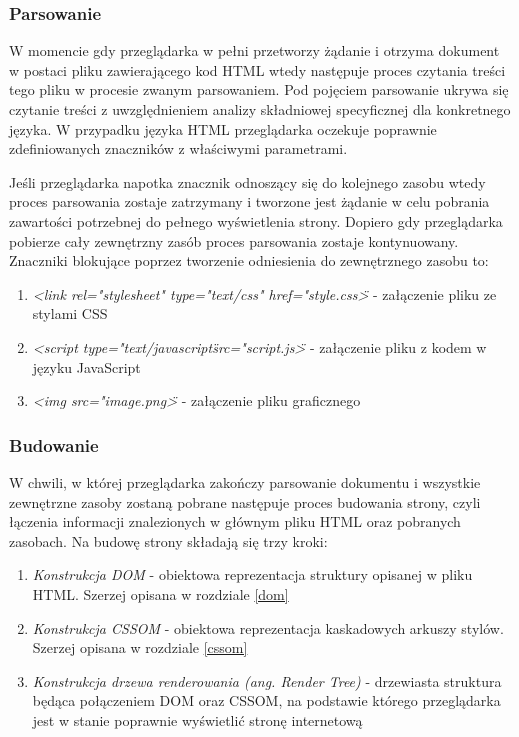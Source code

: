 \documentclass[polish, twoside, 12pt]{mwart}
\begin{document}
\subsubsection{Parsowanie}

W momencie gdy przeglądarka w pełni przetworzy żądanie i otrzyma dokument w postaci pliku zawierającego kod HTML wtedy następuje proces czytania treści tego pliku w procesie zwanym parsowaniem. Pod pojęciem parsowanie ukrywa się czytanie treści z uwzględnieniem analizy składniowej specyficznej dla konkretnego języka. W przypadku języka HTML przeglądarka oczekuje poprawnie zdefiniowanych znaczników z właściwymi parametrami. 

Jeśli przeglądarka napotka znacznik odnoszący się do kolejnego zasobu wtedy proces parsowania zostaje zatrzymany i tworzone jest żądanie  w celu pobrania zawartości potrzebnej do pełnego wyświetlenia strony. Dopiero gdy przeglądarka pobierze cały zewnętrzny zasób proces parsowania zostaje kontynuowany. Znaczniki blokujące poprzez tworzenie odniesienia do zewnętrznego zasobu to:

\begin{enumerate}
  \item \emph{<link rel="stylesheet" type="text/css" href="style.css\">} - załączenie pliku ze stylami CSS
  \item \emph{<script type="text/javascript\" src="script.js\">} - załączenie pliku z kodem w języku JavaScript
  \item \emph{<img src="image.png\">} - załączenie pliku graficznego
\end{enumerate}

\subsubsection{Budowanie}

W chwili, w której przeglądarka zakończy parsowanie dokumentu i wszystkie zewnętrzne zasoby zostaną pobrane następuje proces budowania strony, czyli łączenia informacji znalezionych w głównym pliku HTML oraz pobranych zasobach. Na budowę strony składają się trzy kroki:

\begin{enumerate}
  \item \emph{Konstrukcja DOM} - obiektowa reprezentacja struktury opisanej w pliku HTML. Szerzej opisana w rozdziale \ref{dom}
  \item \emph{Konstrukcja CSSOM} - obiektowa reprezentacja kaskadowych arkuszy stylów. Szerzej opisana w rozdziale \ref{cssom}
  \item \emph{Konstrukcja drzewa renderowania (ang. Render Tree)} - drzewiasta struktura będąca połączeniem DOM oraz CSSOM, na podstawie którego przeglądarka jest w stanie poprawnie wyświetlić stronę internetową
\end{enumerate}
\end{document}
